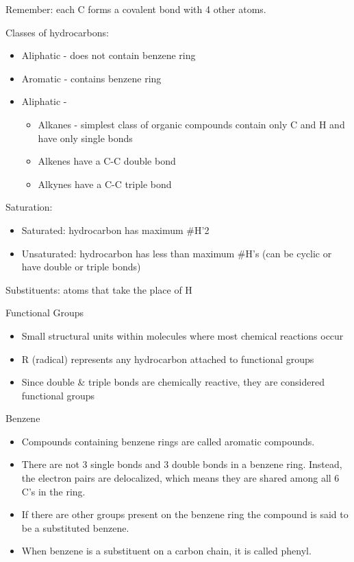 \documentclass[../hchem.tex]{subfiles}
\begin{document}
Remember: each C forms a covalent bond with 4 other atoms.

Classes of hydrocarbons:
\begin{itemize}
    \item Aliphatic - does not contain benzene ring 
    \item Aromatic - contains benzene ring 
    \item Aliphatic -
    \begin{itemize}
        \item Alkanes - simplest class of organic compounds contain only C and H and have only single bonds 
        \item Alkenes have a C-C double bond 
        \item Alkynes have a C-C triple bond 
    \end{itemize}
\end{itemize}

Saturation:
\begin{itemize}
    \item Saturated: hydrocarbon has maximum \#H'2 
    \item Unsaturated: hydrocarbon has less than maximum \#H's (can be cyclic or have double or triple bonds)
\end{itemize}

Substituents: atoms that take the place of H 

Functional Groups 
\begin{itemize}
    \item Small structural units within molecules where most chemical reactions occur 
    \item R (radical) represents any hydrocarbon attached to functional groups 
    \item Since double \& triple bonds are chemically reactive, they are considered functional groups 
\end{itemize}

Benzene 
\begin{itemize}
    \item Compounds containing benzene rings are called aromatic compounds.
    \item There are not 3 single bonds and 3 double bonds in a benzene ring. Instead, the electron pairs are delocalized, which means they are shared among all 6 C's in the ring. 
    \item If there are other groups present on the benzene ring the compound is said to be a substituted benzene.
    \item When benzene is a substituent on a carbon chain, it is called phenyl.
\end{itemize}
\end{document}

